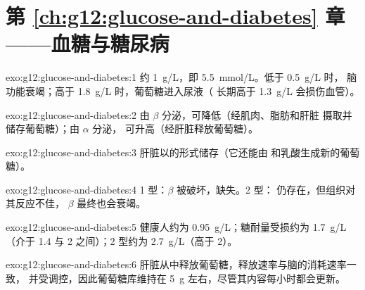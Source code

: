 \section*{第 \ref{ch:g12:glucose-and-diabetes} 章——血糖与糖尿病}

\begin{solution}{exo:g12:glucose-and-diabetes:1}
约 \qty{1}{g/L}，即 \qty{5.5}{mmol/L}。低于 \qty{0.5}{g/L} 时，
脑功能衰竭；高于 \qty{1.8}{g/L} 时，葡萄糖进入尿液（
长期高于 \qty{1.3}{g/L} 会损伤血管）。
\end{solution}

\begin{solution}{exo:g12:glucose-and-diabetes:2}
由 $\beta$ 分泌，可降低（经肌肉、脂肪和肝脏
摄取并储存葡萄糖）；由 $\alpha$ 分泌，
可升高（经肝脏释放葡萄糖）。
\end{solution}

\begin{solution}{exo:g12:glucose-and-diabetes:3}
肝脏以的形式储存（它还能由
和乳酸生成新的葡萄糖）。
\end{solution}

\begin{solution}{exo:g12:glucose-and-diabetes:4}
1 型：$\beta$ 被破坏，缺失。2 型：
仍存在，但组织对其反应不佳，
$\beta$ 最终也会衰竭。
\end{solution}

\begin{solution}{exo:g12:glucose-and-diabetes:5}
健康人约为 \qty{0.95}{g/L}；糖耐量受损约为 \qty{1.7}{g/L}
（介于 1.4 与 2 之间）；2 型约为 \qty{2.7}{g/L}（高于 2）。
\end{solution}

\begin{solution}{exo:g12:glucose-and-diabetes:6}
肝脏从中释放葡萄糖，释放速率与脑的消耗速率一致，
并受调控，因此葡萄糖库维持在
\qty{5}{g} 左右，尽管其内容每小时都会更新。
\end{solution}

